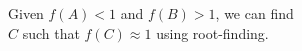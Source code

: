 \documentclass[preview]{standalone}
\begin{document}
\begin{center}
Given $f(A) < 1$ and $f(B) > 1$, we can find\\$C$ such that $f(C) \approx 1$ using root-finding.
\end{center}
\end{document}
